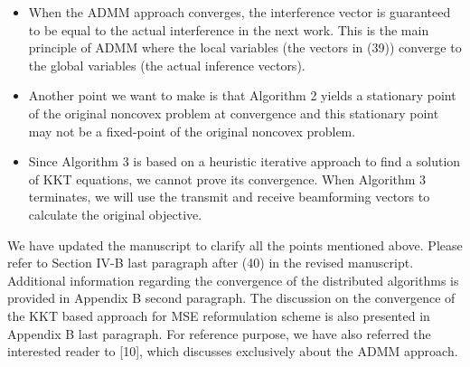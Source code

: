 \begin{enumerate}
\begin{itemize}
\item When the ADMM approach converges, the interference vector is guaranteed to be equal to the actual interference in the next work. This is the main principle of \ac{ADMM} where the local variables (the vectors in (39)) converge to the global variables (the actual inference vectors).

\item Another point we want to make is that Algorithm 2 yields a stationary point of the original noncovex problem at convergence and this stationary point may not be a fixed-point of the original noncovex problem. 

\item Since Algorithm 3 is based on a heuristic iterative approach to find a solution of \ac{KKT} equations, we cannot prove its convergence. When Algorithm 3 terminates, we will use the transmit and receive beamforming vectors to calculate the original objective.

\end{itemize}

We have updated the manuscript to clarify all the points mentioned above. Please refer to Section IV-B last paragraph after (40) in the revised manuscript. Additional information regarding the convergence of the distributed algorithms is provided in Appendix B second paragraph. The discussion on the convergence of the KKT based approach for MSE reformulation scheme is also presented in Appendix B last paragraph. For reference purpose, we have also referred the interested reader to [10], which discusses exclusively about the ADMM approach.


\end{enumerate}
